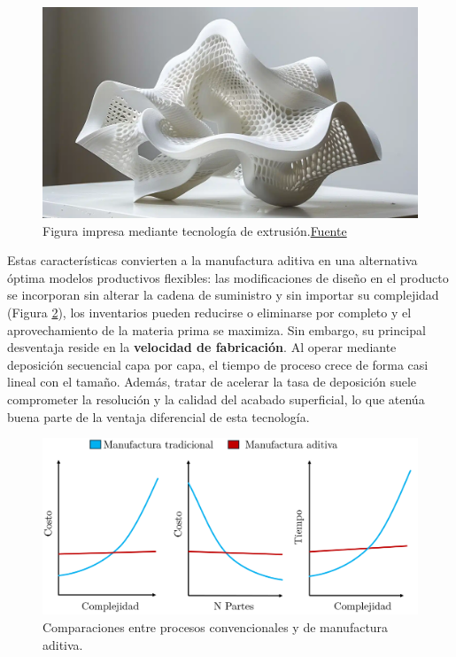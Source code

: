 \begin{figure}[h!]
	\centering
	\includegraphics[width=0.8\linewidth]{imgs/3pex.png}
	\caption{Figura impresa mediante tecnología de extrusión.\href{https://blog.emb.global/impact-of-3d-printing-in-product-development/}{Fuente}}
	\label{3pexf}
\end{figure}

Estas características convierten a la manufactura aditiva en una alternativa óptima modelos productivos flexibles: las modificaciones de diseño en el producto se incorporan sin alterar la cadena de suministro y sin importar su complejidad (Figura \ref{grafsmm}), los inventarios pueden reducirse o eliminarse por completo y el aprovechamiento de la materia prima se maximiza. Sin embargo, su principal desventaja reside en la \textbf{velocidad de fabricación}. Al operar mediante deposición secuencial capa por capa, el tiempo de proceso crece de forma casi lineal con el tamaño. Además, tratar de acelerar la tasa de deposición suele comprometer la resolución y la calidad del acabado superficial, lo que atenúa buena parte de la ventaja diferencial de esta tecnología.

\begin{figure}[h!]
	\centering
	\includegraphics[width=0.9\linewidth]{imgs/grafsmm.png}
	\caption{Comparaciones entre procesos convencionales y de manufactura aditiva.}
	\label{grafsmm}
\end{figure}


